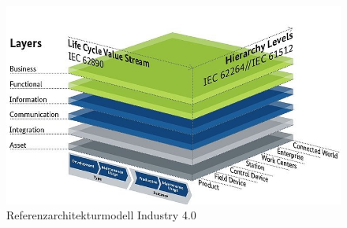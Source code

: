 \begin{figure}[h]
\includegraphics[scale=0.5]{content/pictures/rami_4.0_zvei.jpg}
\caption{Referenzarchitekturmodell Industry 4.0}
\label{fig:rami40}
\end{figure}

